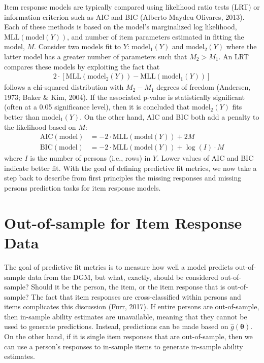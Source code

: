 \documentclass[
  english,
  man,floatsintext]{apa7}
\begin{document}
Item response models are typically compared using likelihood ratio tests (LRT) or information criterion such as AIC and BIC (Alberto Maydeu-Olivares, 2013). Each of these methods is based on the model's marginalized log likelihood, \(\text{MLL}(\text{model}(Y))\), and number of item parameters estimated in fitting the model, \(M\). Consider two models fit to \(Y\): \(\text{model}_1(Y)\) and \(\text{model}_2(Y)\) where the latter model has a greater number of parameters such that \(M_2 > M_1\). An LRT compares these models by exploiting the fact that
\begin{align}
2 \cdot [\text{MLL}(\text{model}_2(Y)) - \text{MLL}(\text{model}_1(Y))]
\end{align}
follows a chi-squared distribution with \(M_2 - M_1\) degrees of freedom (Andersen, 1973; Baker \& Kim, 2004). If the associated p-value is statistically significant (often at a 0.05 significance level), then it is concluded that \(\text{model}_2(Y)\) fits better than \(\text{model}_1(Y)\). On the other hand, AIC and BIC both add a penalty to the likelihood based on \(M\):
\begin{align}
\text{AIC}(\text{model}) &= -2 \cdot \text{MLL}(\text{model}(Y)) + 2M \\
\text{BIC}(\text{model}) &= -2 \cdot \text{MLL}(\text{model}(Y)) + \log(I) \cdot M
\end{align}
where \(I\) is the number of persons (i.e., rows) in \(Y\). Lower values of AIC and BIC indicate better fit. With the goal of defining predictive fit metrics, we now take a step back to describe from first principles the missing responses and missing persons prediction tasks for item response models.

\hypertarget{oos}{%
\section{Out-of-sample for Item Response Data}\label{oos}}

The goal of predictive fit metrics is to measure how well a model predicts out-of-sample data from the DGM, but what, exactly, should be considered out-of-sample? Should it be the person, the item, or the item response that is out-of-sample? The fact that item responses are cross-classified within persons and items complicates this discussion (Furr, 2017). If entire persons are out-of-sample, then in-sample ability estimates are unavailable, meaning that they cannot be used to generate predictions. Instead, predictions can be made based on \(\hat g(\bm{\theta})\). On the other hand, if it is single item responses that are out-of-sample, then we can use a person's responses to in-sample items to generate in-sample ability estimates.
\end{document}
